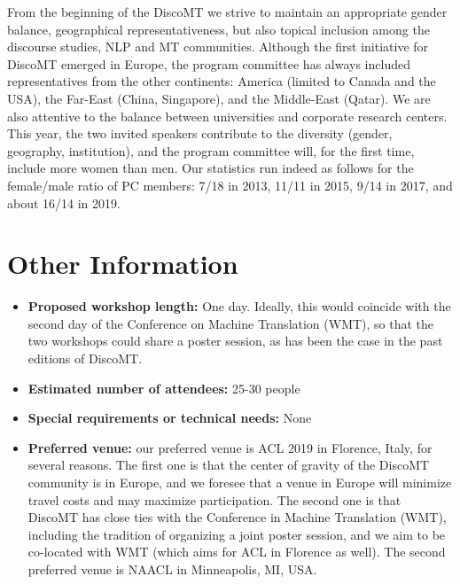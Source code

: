 \documentclass[11pt]{article}
\begin{document}
From the beginning of the DiscoMT we strive to maintain an appropriate gender balance, geographical representativeness, but also topical inclusion among the discourse studies, NLP and MT communities.  Although the first initiative for DiscoMT emerged in Europe, the program committee has always included representatives from the other continents: America (limited to Canada and the USA), the Far-East (China, Singapore), and the Middle-East (Qatar).  We are also attentive to the balance between universities and corporate research centers.  This year, the two invited speakers contribute to the diversity (gender, geography, institution), and the program committee will, for the first time, include more women than men.  Our statistics run indeed as follows for the female/male ratio of PC members: 7/18 in 2013, 11/11 in 2015, 9/14 in 2017, and about 16/14 in 2019.



\section{Other Information}

\begin{itemize}
\item \textbf{Proposed workshop length:} One day.  Ideally, this would coincide with
the second day of the Conference on Machine Translation (WMT), so that the two workshops could
share a poster session, as has been the case in the past editions of DiscoMT.

\item \textbf{Estimated number of attendees:} 25-30 people

\item \textbf{Special requirements or technical needs:} None

\item \textbf{Preferred venue:} our preferred venue is ACL 2019 in Florence, Italy, for several reasons.  The first one is that the center of gravity of the DiscoMT community is in Europe, and we foresee that a venue in Europe will minimize travel costs and may maximize participation.  The second one is that DiscoMT has close ties with the Conference in Machine Translation (WMT), including the tradition of organizing a joint poster session, and we aim to be co-located with WMT (which aims for ACL in Florence as well).  The second preferred venue is NAACL in Minneapolis, MI, USA.

\end{itemize}
\end{document}
